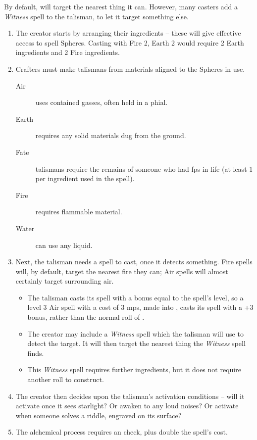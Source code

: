 \begin{multicols}{2}
By default,  will target the nearest thing it can.
However, many casters add a \textit{Witness} spell to the \gls{talisman}, to let it target something else.

\begin{enumerate}
  \item
  The creator starts by arranging their \glspl{ingredient} -- these will give effective access to spell Spheres.
  Casting with Fire 2, Earth 2 would require 2 Earth \glspl{ingredient} and 2 Fire \glspl{ingredient}.
  \item
  Crafters must make \glspl{talisman} from materials aligned to the Spheres in use.
  \begin{description}
    \item[Air]
    uses contained gasses, often held in a phial.
    \item[Earth]
    requires any solid materials dug from the ground.
    \item[Fate]
    talismans require the remains of someone who had \glspl{fp} in life (at least 1 per \gls{ingredient} used in the spell).
    \item[Fire]
    requires flammable material.
    \item[Water]
    can use any liquid.
  \end{description}
  \item
  Next, the \gls{talisman} needs a spell to cast, once it detects something.
  Fire spells will, by default, target the nearest fire they can; Air spells will almost certainly target surrounding air.
  \begin{itemize}
    \item
    The \gls{talisman} casts its spell with a bonus equal to the spell's level, so a level 3 Air spell with a cost of 3 \glspl{mp}, made into , casts its spell with a +3 bonus, rather than the normal roll of .
    \item
    The creator may include a \textit{Witness} spell which the \gls{talisman} will use to detect the target.
    It will then target the nearest thing the \textit{Witness} spell finds.
    \item
    This \textit{Witness} spell requires further \glspl{ingredient}, but it does not require another roll to construct.
  \end{itemize}
  \item
  The creator then decides upon the talisman's activation conditions -- will it activate once it sees starlight?
  Or awaken to any loud noises?
  Or activate when someone solves a riddle, engraved on its surface?
  \item
  The alchemical process requires an  check, \tn[10] plus double the spell's cost.
\end{enumerate}


\end{multicols}
